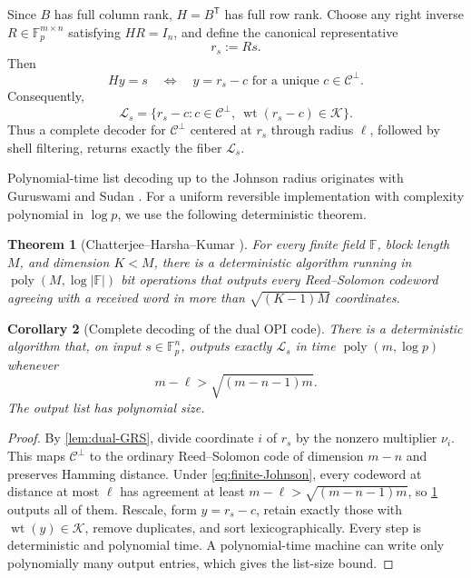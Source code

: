 \documentclass[10pt,a4paper]{amsart}
\newtheorem{theorem}{Theorem}[section]
\newtheorem{corollary}[theorem]{Corollary}
\newcommand{\F}{\mathbb{F}}
\newcommand{\C}{\mathcal{C}}
\newcommand{\Kcal}{\mathcal{K}}
\newcommand{\Lcal}{\mathcal{L}}
\newcommand{\wt}{\operatorname{wt}}
\newcommand{\poly}{\operatorname{poly}}
\newcommand{\abs}[1]{\left\lvert #1\right\rvert}
\begin{document}
Since $B$ has full column rank, $H=B^{\mathsf T}$ has full row rank.  Choose any right inverse $R\in\F_p^{m\times n}$ satisfying $HR=I_n$, and define the canonical representative
\begin{equation}
   r_s:=Rs.
   \label{eq:representative}
\end{equation}
Then
\begin{equation}
   Hy=s
   \quad\Longleftrightarrow\quad
   y=r_s-c\text{ for a unique }c\in\C^\perp.
   \label{eq:coset-bijection}
\end{equation}
Consequently,
\begin{equation}
   \Lcal_s
   =\{r_s-c:c\in\C^\perp,\ \wt(r_s-c)\in\Kcal\}.
   \label{eq:fiber-list}
\end{equation}
Thus a complete decoder for $\C^\perp$ centered at $r_s$ through radius $\ell$, followed by shell filtering, returns exactly the fiber $\Lcal_s$.

Polynomial-time list decoding up to the Johnson radius originates with Guruswami and Sudan \cite{GuruswamiSudan1999}.  For a uniform reversible implementation with complexity polynomial in $\log p$, we use the following deterministic theorem.

\begin{theorem}[Chatterjee--Harsha--Kumar \cite{ChatterjeeEtAl2026}]
\label{thm:CHK}
For every finite field $\F$, block length $M$, and dimension $K<M$, there is a deterministic algorithm running in $\poly(M,\log\abs{\F})$ bit operations that outputs every Reed--Solomon codeword agreeing with a received word in more than $\sqrt{(K-1)M}$ coordinates.
\end{theorem}

\begin{corollary}[Complete decoding of the dual OPI code]
\label{cor:dual-list-decoding}
There is a deterministic algorithm that, on input $s\in\F_p^n$, outputs exactly $\Lcal_s$ in time $\poly(m,\log p)$ whenever
\begin{equation}
   m-\ell>\sqrt{(m-n-1)m}.
   \label{eq:finite-Johnson}
\end{equation}
The output list has polynomial size.
\end{corollary}

\begin{proof}
By \cref{lem:dual-GRS}, divide coordinate $i$ of $r_s$ by the nonzero multiplier $\nu_i$.  This maps $\C^\perp$ to the ordinary Reed--Solomon code of dimension $m-n$ and preserves Hamming distance.  Under \cref{eq:finite-Johnson}, every codeword at distance at most $\ell$ has agreement at least $m-\ell>\sqrt{(m-n-1)m}$, so \cref{thm:CHK} outputs all of them.  Rescale, form $y=r_s-c$, retain exactly those with $\wt(y)\in\Kcal$, remove duplicates, and sort lexicographically.  Every step is deterministic and polynomial time.  A polynomial-time machine can write only polynomially many output entries, which gives the list-size bound.
\end{proof}
\end{document}
